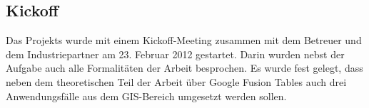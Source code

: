 \subsection{Kickoff}
Das Projekts wurde mit einem Kickoff-Meeting zusammen mit dem Betreuer und dem Industriepartner am 23. Februar 2012 gestartet. Darin wurden nebst der Aufgabe auch alle Formalitäten der Arbeit besprochen. Es wurde fest gelegt, dass neben dem theoretischen Teil der Arbeit über Google Fusion Tables auch drei Anwendungsfälle aus dem \gls{GIS}-Bereich umgesetzt werden sollen.